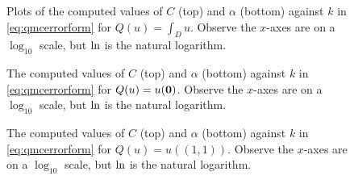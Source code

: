 \begin{figure}[h]
    \centering
    \begin{subfigure}{\textwidth}
      \centering

    \end{subfigure}
    \begin{subfigure}{\textwidth}
                \centering
      
    \end{subfigure}
\caption[The computed Quasi-Monte-Carlo convergence rate for $Q(u) =  \int_D u$.]{Plots of the computed values of $C$ (top) and $\alpha$ (bottom) against $k$ in \cref{eq:qmcerrorform} for $Q(u) = \int_D u$. Observe the $x$-axes are on a $\log_{10}$ scale, but $\operatorname{ln}$ is the natural logarithm. \label{fig:integralCalpha}}
\end{figure}

\begin{figure}[h]
    \centering
    \begin{subfigure}{\textwidth}
            \centering

  \end{subfigure}
    \begin{subfigure}{\textwidth}
                \centering

    \end{subfigure}

\caption[The computed Quasi-Monte-Carlo convergence rate for $Q(u) =  u(\bzero)$.]{The computed values of $C$ (top) and $\alpha$ (bottom) against $k$ in \cref{eq:qmcerrorform} for $Q(u) =  u(\bzero)$. Observe the $x$-axes are on a $\log_{10}$ scale, but $\operatorname{ln}$ is the natural logarithm. \label{fig:originCalpha}}
\end{figure}

\begin{figure}[h]
    \centering
    \begin{subfigure}{\textwidth}
            \centering

  \end{subfigure}
    \begin{subfigure}{\textwidth}
            \centering

    \end{subfigure}
\caption[The computed Quasi-Monte-Carlo convergence rate for $Q(u) =  u(1,1)$.]{The computed values of $C$ (top) and $\alpha$ (bottom) against $k$ in \cref{eq:qmcerrorform} for $Q(u) = u((1,1))$. Observe the $x$-axes are on a $\log_{10}$ scale, but $\operatorname{ln}$ is the natural logarithm.  \label{fig:toprightCalpha}}
\end{figure}

